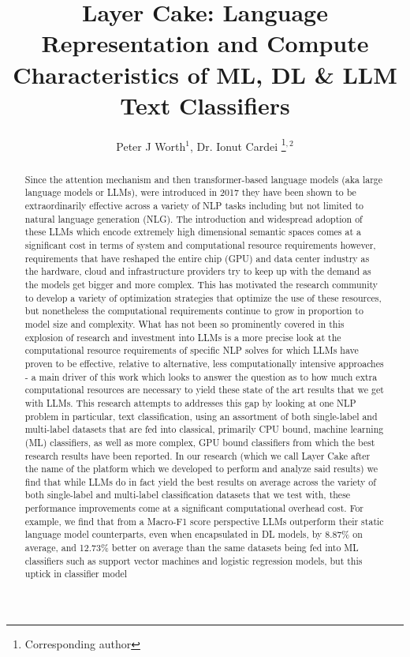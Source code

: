 \documentclass[final]{clv2025}
\begin{document}
\title{Layer Cake: Language Representation and Compute Characteristics of ML, DL \& LLM Text Classifiers}

\author{Peter J Worth$^{1}$, Dr. Ionut Cardei \thanks{Corresponding author}$^{,2}$}


\maketitle

\begin{abstract}
Since the attention mechanism and then transformer-based language models (aka large language models or LLMs), were introduced in 2017 they have been shown to be extraordinarily effective across a variety of NLP tasks including but not limited to natural language generation (NLG). The introduction and widespread adoption of these LLMs which encode extremely high dimensional semantic spaces comes at a significant cost in terms of  system and computational resource requirements however, requirements that have reshaped the entire chip (GPU) and data center industry as the hardware, cloud and infrastructure providers try to keep up with the demand as the models get bigger and more complex. This has motivated the research community to develop a variety of optimization strategies that optimize the use of these resources, but nonetheless the computational requirements continue to grow in proportion to model size and complexity. What has not been so prominently covered in this explosion of research and investment into LLMs is a more precise look at the computational resource requirements of specific NLP solves for which LLMs have proven to be effective, relative to alternative, less computationally intensive approaches - a main driver of this work which looks to answer the question as to how much extra computational resources are necessary to yield these state of the art results that we get with LLMs. This research attempts to addresses this gap by looking at one NLP problem in particular, text classification, using an assortment of both single-label and multi-label datasets that are fed into classical, primarily CPU bound, machine learning (ML) classifiers, as well as more complex, GPU bound classifiers from which the best research results have been reported. In our research (which we call Layer Cake after the name of the platform which we developed to perform and analyze said results) we find that while LLMs do in fact yield the best results on average across the variety of both single-label and multi-label classification datasets that we test with, these performance improvements come at a significant computational overhead cost. For example, we find that from a Macro-F1 score perspective LLMs outperform their static language model counterparts, even when encapsulated in DL models, by 8.87\% on average, and 12.73\% better on average than the same datasets being fed into  ML classifiers such as support vector machines and logistic regression models, but this uptick in classifier model 
\end{abstract}
\end{document}
